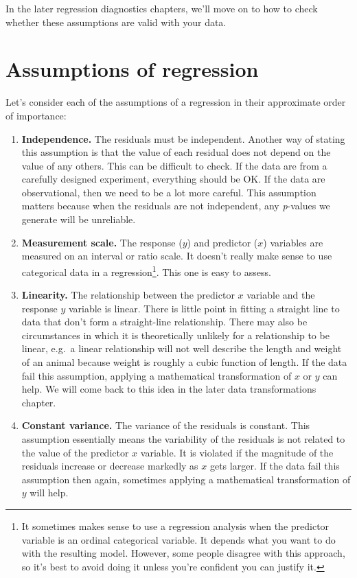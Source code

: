 \documentclass[
]{book}
\begin{document}
In the later regression diagnostics chapters, we'll move on to how to check whether these assumptions are valid with your data.

\hypertarget{assumptions-of-regression}{%
\section{Assumptions of regression}\label{assumptions-of-regression}}

Let's consider each of the assumptions of a regression in their approximate order of importance:

\begin{enumerate}
\def\labelenumi{\arabic{enumi}.}
\item
  \textbf{Independence.} The residuals must be independent. Another way of stating this assumption is that the value of each residual does not depend on the value of any others. This can be difficult to check. If the data are from a carefully designed experiment, everything should be OK. If the data are observational, then we need to be a lot more careful. This assumption matters because when the residuals are not independent, any \emph{p}-values we generate will be unreliable.
\item
  \textbf{Measurement scale.} The response (\(y\)) and predictor (\(x\)) variables are measured on an interval or ratio scale. It doesn't really make sense to use categorical data in a regression\footnote{It sometimes makes sense to use a regression analysis when the predictor variable is an ordinal categorical variable. It depends what you want to do with the resulting model. However, some people disagree with this approach, so it's best to avoid doing it unless you're confident you can justify it.}. This one is easy to assess.
\item
  \textbf{Linearity.} The relationship between the predictor \(x\) variable and the response \(y\) variable is linear. There is little point in fitting a straight line to data that don't form a straight-line relationship. There may also be circumstances in which it is theoretically unlikely for a relationship to be linear, e.g.~a linear relationship will not well describe the length and weight of an animal because weight is roughly a cubic function of length. If the data fail this assumption, applying a mathematical transformation of \(x\) or \(y\) can help. We will come back to this idea in the later data transformations chapter.
\item
  \textbf{Constant variance.} The variance of the residuals is constant. This assumption essentially means the variability of the residuals is not related to the value of the predictor \(x\) variable. It is violated if the magnitude of the residuals increase or decrease markedly as \(x\) gets larger. If the data fail this assumption then again, sometimes applying a mathematical transformation of \(y\) will help.

\end{enumerate}
\end{document}
